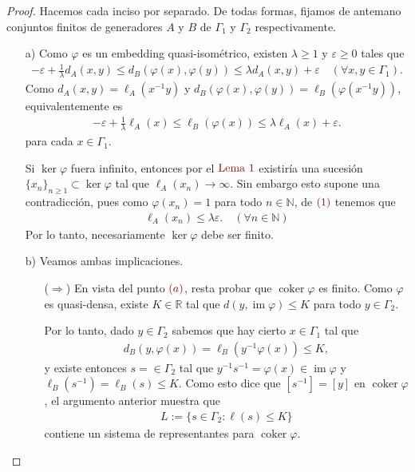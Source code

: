 \documentclass[11pt]{article}
\theoremstyle{colored}
\newcommand{\N}{\mathbb{N}}
\newcommand{\R}{\mathbb{R}}
\newcommand{\im}{\operatorname{im}}
\newcommand{\coker}{\operatorname{coker}}
\newcommand{\paint}[1]{\color{color}{#1}}
\begin{document}
\begin{proof} Hacemos cada inciso por separado. De todas formas, fijamos de antemano conjuntos finitos de generadores $A$ y $B$ de $\Gamma_1$ y $\Gamma_2$ respectivamente.  
\begin{itemize}[listparindent = \parindent]
\item[a)] Como $\varphi$ es un embedding quasi-isométrico, existen $\lambda \geq 1$ y $\varepsilon \geq 0$ tales que
\begin{align*}
-\varepsilon + \frac{1}{\lambda}d_A(x,y) \leq d_B(\varphi(x),\varphi(y)) \leq \lambda d_A(x,y) + \varepsilon \quad (\forall x,y \in \Gamma_1).
\end{align*}
Como $d_A(x,y) = \ell_A(x^{-1}y)$ y $d_B(\varphi(x),\varphi(y)) = \ell_B(\varphi(x^{-1}y))$, equivalentemente es
\begin{align}
-\varepsilon + \frac{1}{\lambda}\ell_A(x) \leq \ell_B(\varphi(x)) \leq \lambda \ell_A(x) + \varepsilon.
\end{align}
para cada $x \in \Gamma_1$.

Si $\ker \varphi$ fuera infinito, entonces por el $\paint{\text{Lema $1$}}$ existiría una sucesión $\{x_n\}_{n \geq 1} \subset \ker \varphi$ tal que $\ell_A(x_n) \to \infty$. Sin embargo esto supone una contradicción, pues como $\varphi(x_n) = 1$ para todo $n \in \N$, de $\paint{(1)}$ tenemos que
\begin{align*}
\ell_A(x_n) \leq \lambda\varepsilon. \quad (\forall n \in \N)
\end{align*}
Por lo tanto, necesariamente $\ker \varphi$ debe ser finito.
\item[b)] Veamos ambas implicaciones.
\begin{itemize}[listparindent = \parindent]
\item[($\Rightarrow$)] En vista del punto $\paint{(a)}$, resta probar que $\coker \varphi$ es finito. Como $\varphi$ es quasi-densa, existe $K \in \R$ tal que $d(y,\im \varphi) \leq K$ para todo $y \in \Gamma_2$. 

Por lo tanto, dado $y \in \Gamma_2$ sabemos que hay cierto $x \in \Gamma_1$ tal que 
\begin{align*}
d_B(y, \varphi(x)) = \ell_B(y^{-1}\varphi(x)) \leq K,
\end{align*}
y existe entonces $s  = \in \Gamma_2$ tal que $y^{-1}s^{-1} = \varphi(x) \in \im \varphi$ y $\ell_B(s^{-1}) = \ell_B(s) \leq K$. Como esto dice que $[s^{-1}] = [y]$ en $\coker \varphi$, el argumento anterior muestra que
\begin{align*}
L := \{s \in \Gamma_2 : \ell(s) \leq K \}
\end{align*}
contiene un sistema de representantes para $\coker \varphi$. 


\end{itemize}
\end{itemize}
\end{proof}
\end{document}
